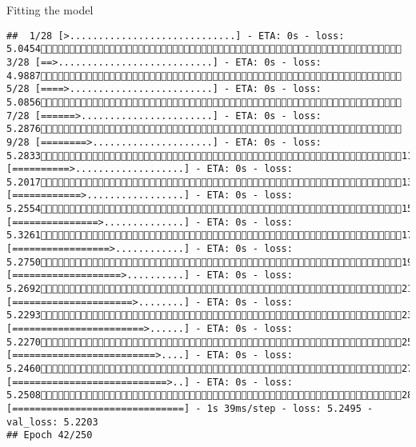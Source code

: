 \documentclass[
  ignorenonframetext,
]{beamer}
\begin{document}
\begin{frame}[fragile]{Fitting the model}
\begin{verbatim}
##  1/28 [>.............................] - ETA: 0s - loss: 5.0454 3/28 [==>...........................] - ETA: 0s - loss: 4.9887 5/28 [====>.........................] - ETA: 0s - loss: 5.0856 7/28 [======>.......................] - ETA: 0s - loss: 5.2876 9/28 [========>.....................] - ETA: 0s - loss: 5.283311/28 [==========>...................] - ETA: 0s - loss: 5.201713/28 [============>.................] - ETA: 0s - loss: 5.255415/28 [===============>..............] - ETA: 0s - loss: 5.326117/28 [=================>............] - ETA: 0s - loss: 5.275019/28 [===================>..........] - ETA: 0s - loss: 5.269221/28 [=====================>........] - ETA: 0s - loss: 5.229323/28 [=======================>......] - ETA: 0s - loss: 5.227025/28 [=========================>....] - ETA: 0s - loss: 5.246027/28 [===========================>..] - ETA: 0s - loss: 5.250828/28 [==============================] - 1s 39ms/step - loss: 5.2495 - val_loss: 5.2203
## Epoch 42/250

\end{verbatim}
\end{frame}
\end{document}
